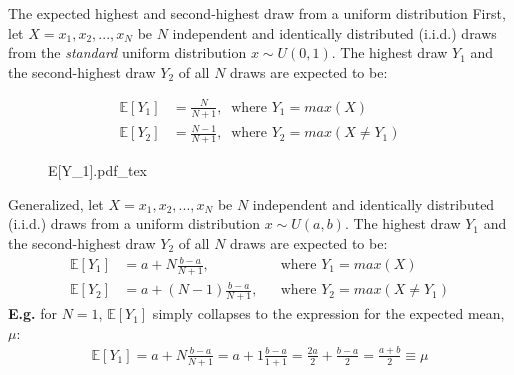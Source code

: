 \begin{frame}{The expected highest and second-highest draw from a uniform distribution}
    First, let $X=x_1,x_2,...,x_N$ be $N$ independent and identically distributed (i.i.d.) draws from the \textit{standard} uniform distribution $x\sim U(0, 1)$. The highest draw $Y_1$ and the second-highest draw $Y_2$ of all $N$ draws are expected to be: \vspace{-12pt}
    \begin{multicols}{2}
      \begin{align*}
        \mathbb{E}[Y_1]&=\frac{N}{N+1},\ \text{ where }Y_1=max(X)\\
        \mathbb{E}[Y_2]&=\frac{N-1}{N+1},\ \text{ where }Y_2=max(X\neq Y_1)
      \end{align*}
      \vfill\null\columnbreak
      \begin{figure}[!h]
        \center
        \def\svgwidth{1.1\columnwidth}
        {E[Y_1].pdf_tex}
      \end{figure}
      \vfill\null
    \end{multicols} \vspace{-24pt}
    Generalized, let $X=x_1,x_2,...,x_N$ be $N$ independent and identically distributed (i.i.d.) draws from a uniform distribution $x\sim U(a, b)$. The highest draw $Y_1$ and the second-highest draw $Y_2$ of all $N$ draws are expected to be: \vspace{-2pt}
    \begin{align*}
      \mathbb{E}[Y_1]&=a+N\frac{b-a}{N+1},&&\text{where }Y_1=max(X)\\
      \mathbb{E}[Y_2]&=a+(N-1)\frac{b-a}{N+1},&&\text{where }Y_2=max(X\neq Y_1)
    \end{align*}
    \textbf{E.g.} for $N=1$, $\mathbb{E}[Y_1]$ simply collapses to the expression for the expected mean, $\mu$:\vspace{-2pt}
    \begin{align*}
      \mathbb{E}[Y_1]=a+N\frac{b-a}{N+1}=a+1\frac{b-a}{1+1}=\frac{2a}{2}+\frac{b-a}{2}=\frac{a+b}{2}\equiv\mu
    \end{align*}
\end{frame}

